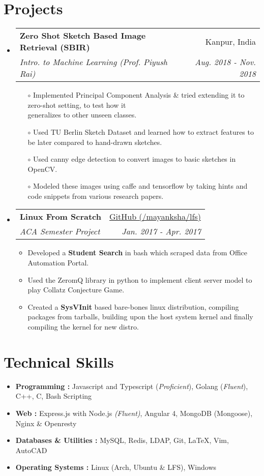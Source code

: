 \documentclass[a4paper,20pt]{article}
\makeatletter
\newcommand{\resumeSubheading}[4]{
	\vspace{-1pt}\item
	\begin{tabular*}{0.97\textwidth}{l@{\extracolsep{\fill}}r}
		\textbf{#1} & #2 \\
		\textit{\small#3} & \textit{\small #4} \\
	\end{tabular*}\vspace{-7pt}
}
\newcommand{\resumeSubHeadingListStart}{\begin{itemize}[leftmargin=*]}
\newcommand{\resumeSubHeadingListEnd}{\end{itemize}}
\makeatother
\begin{document}
\section{Projects}
\resumeSubHeadingListStart
\resumeSubheading
		{Zero Shot Sketch Based Image Retrieval (SBIR)}{Kanpur, India}
{Intro. to Machine Learning (Prof. Piyush Rai)}{Aug. 2018 - Nov. 2018}
\vspace{2pt}
\begin{itemize}
	\item[$\circ$] Implemented Principal Component Analysis \& tried extending it to zero-shot setting, to test how it \\ generalizes to other unseen classes.
	\item[$\circ$] Used TU Berlin Sketch Dataset and learned how to extract features to be later compared to hand-drawn sketches. 
	\item[$\circ$] Used canny edge detection to convert images to basic sketches in OpenCV. 
	\item[$\circ$] Modeled these images using caffe and tensorflow by taking hints and code snippets from various research papers.
\end{itemize}
\resumeSubheading
{Linux From Scratch}{ \textbf{\hfill}\href{https://github.com/mayanksha/lfs} {\faGithub \hspace{0.1em} GitHub (/mayanksha/lfs)}}
{ACA Semester Project}{Jan. 2017 - Apr. 2017}
\vspace{2pt}
	\begin{itemize}
				\item Developed a {\bf Student Search} in bash which scraped data from Office Automation Portal. 
				\item Used the ZeromQ library in python to implement client server model to play Collatz Conjecture Game.
				\item Created a \textbf{SysVInit} based bare-bones linux distribution, compiling packages from tarballs, building upon the host system kernel and finally compiling the kernel for new distro.
	\end{itemize}
\resumeSubHeadingListEnd

\section{Technical Skills}
\begin{itemize}[noitemsep]
	\item
		\textbf{Programming : }
		Javascript and Typescript (\textit{Proficient}), Golang (\textit{Fluent}), C++, C, Bash Scripting
	\item
		\textbf{Web : }
		Express.js with Node.js \textit{(Fluent)}, Angular 4, MongoDB (Mongoose), Nginx \& Openresty 

	\item
		\textbf{Databases \& Utilities : }
		MySQL, Redis, LDAP, Git, \LaTeX, Vim, AutoCAD
	\item
		\textbf{Operating Systems : }
		Linux (Arch, Ubuntu \& LFS), Windows
		\vspace*{-5pt}
\end{itemize}
\vspace*{-8pt}
\end{document}
